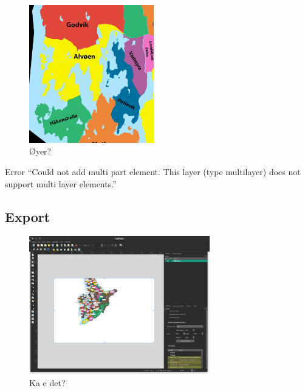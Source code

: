 \begin{frame}
    \begin{figure}
        \centering
        \includegraphics[height = 6cm]{images/qgis_islands.jpg}%
        \caption{Øyer?}
    \end{figure}
\end{frame}

\begin{frame}
    \begin{alertblock}{Error}
        \enquote{Could not add multi part element. This layer (type multilayer) does not support multi layer elements.}
    \end{alertblock}
\end{frame}

\subsection{Export}
\begin{frame}
    \begin{figure}
        \centering
        \includegraphics[height = 6cm]{images/qgis_export.png}%
        \caption{Ka e det?}
    \end{figure}
\end{frame}


